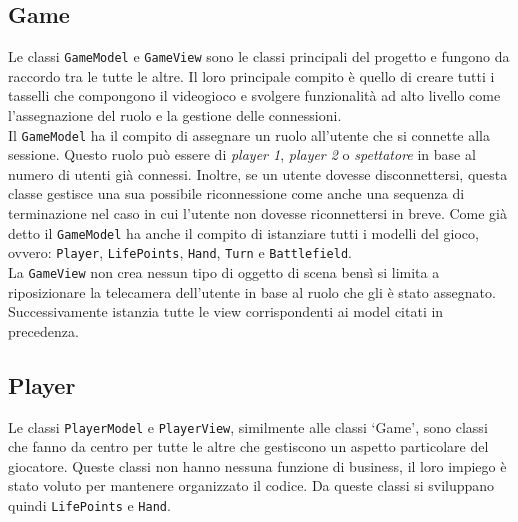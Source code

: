 \subsection{Game}\label{subsec:game}
Le classi \texttt{GameModel} e \texttt{GameView} sono le classi principali del progetto e fungono da raccordo tra le tutte le altre. Il loro principale compito è quello di creare
tutti i tasselli che compongono il videogioco e svolgere funzionalità ad alto livello come l'assegnazione del ruolo e la gestione delle connessioni.\\
Il \texttt{GameModel} ha il compito di assegnare un ruolo all'utente che si connette alla sessione. Questo ruolo può essere di \textit{player 1}, \textit{player 2} o \textit{spettatore} in 
base al numero di utenti già connessi. Inoltre, se un utente dovesse disconnettersi, questa classe gestisce una sua possibile riconnessione come anche una sequenza di terminazione nel
caso in cui l'utente non dovesse riconnettersi in breve. Come già detto il \texttt{GameModel} ha anche il compito di istanziare tutti i modelli del gioco, ovvero: \texttt{Player},
\texttt{LifePoints}, \texttt{Hand}, \texttt{Turn} e \texttt{Battlefield}.\\
La \texttt{GameView} non crea nessun tipo di oggetto di scena bensì si limita a riposizionare la telecamera dell'utente in base al ruolo che gli è stato assegnato. Successivamente istanzia
tutte le view corrispondenti ai model citati in precedenza.\\

\subsection{Player}\label{subsec:player}
Le classi \texttt{PlayerModel} e \texttt{PlayerView}, similmente alle classi `Game', sono classi che fanno da centro per tutte le altre che gestiscono un aspetto particolare del giocatore.
Queste classi non hanno nessuna funzione di business, il loro impiego è stato voluto per mantenere organizzato il codice. Da queste classi si sviluppano quindi \texttt{LifePoints} e
\texttt{Hand}.\\

